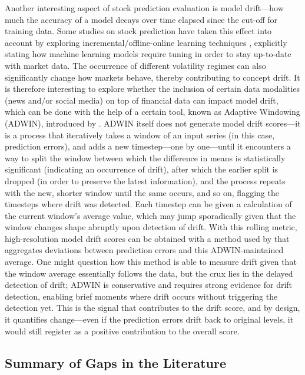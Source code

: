 \documentclass[stu,floatsintext]{apa7}
\begin{document}
Another interesting aspect of stock prediction evaluation is model drift—how much the accuracy of a model decays over time elapsed since the cut-off for training data. Some studies on stock prediction have taken this effect into account by exploring incremental/offline-online learning techniques \parencite{singh2022efficient}, explicitly stating how machine learning models require tuning in order to stay up-to-date with market data. The occurrence of different volatility regimes \parencite{catao2010volatility} can also significantly change how markets behave, thereby contributing to concept drift. It is therefore interesting to explore whether the inclusion of certain data modalities (news and/or social media) on top of financial data can impact model drift, which can be done with the help of a certain tool, known as Adaptive Windowing (ADWIN), introduced by \textcite{bifet2007learning}. ADWIN itself does not generate model drift scores—it is a process that iteratively takes a window of an input series (in this case, prediction errors), and adds a new timestep—one by one—until it encounters a way to split the window between which the difference in means is statistically significant (indicating an occurrence of drift), after which the earlier split is dropped (in order to preserve the latest information), and the process repeats with the new, shorter window until the same occurs, and so on, flagging the timesteps where drift was detected. Each timestep can be given a calculation of the current window’s average value, which may jump sporadically given that the window changes shape abruptly upon detection of drift. With this rolling metric, high-resolution model drift scores can be obtained with a method used by \textcite{garciarubio2026detecting} that aggregates deviations between prediction errors and this ADWIN-maintained average. One might question how this method is able to measure drift given that the window average essentially follows the data, but the crux lies in the delayed detection of drift; ADWIN is conservative and requires strong evidence for drift detection, enabling brief moments where drift occurs without triggering the detection yet. This is the signal that contributes to the drift score, and by design, it quantifies change—even if the prediction errors drift back to original levels, it would still register as a positive contribution to the overall score.

\subsection{Summary of Gaps in the Literature}
\end{document}
